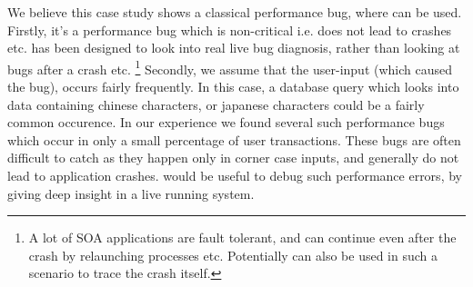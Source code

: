 We believe this case study shows a classical performance bug, where \parikshan can be used.
Firstly, it's a performance bug which is non-critical i.e. does not lead to crashes etc.
\parikshan has been designed to look into real live bug diagnosis, rather than looking at bugs after a crash etc.
\footnote{A lot of SOA applications are fault tolerant, and can continue even after the crash by relaunching processes etc. Potentially \parikshan can also be used in such a scenario to trace the crash itself.}
Secondly, we assume that the user-input (which caused the bug), occurs fairly frequently.
In this case, a database query which looks into data containing chinese characters, or japanese characters could be a fairly common occurence.
In our experience we found several such performance bugs which occur in only a small percentage of user transactions.
These bugs are often difficult to catch as they happen only in corner case inputs, and generally do not lead to application crashes.
\parikshan would be useful to debug such performance errors, by giving deep insight in a live running system.
\fi



